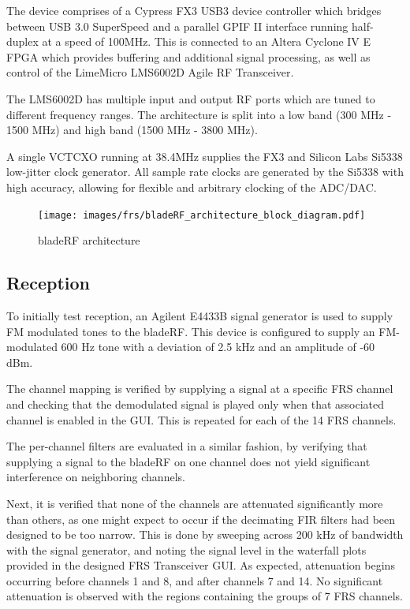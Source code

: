 The device comprises of a Cypress FX3 USB3 device controller which bridges between
USB 3.0 SuperSpeed and a parallel GPIF II interface running half-duplex at a speed
of 100MHz.  This is connected to an Altera Cyclone IV E \ac{FPGA} which provides
buffering and additional signal processing, as well as control of the 
LimeMicro LMS6002D Agile RF Transceiver.

The LMS6002D has multiple input and output RF ports which are tuned to different
frequency ranges.  The architecture is split into a low band (300 MHz - 1500 MHz)
and high band (1500 MHz - 3800 MHz).

A single VCTCXO running at 38.4MHz supplies the FX3 and Silicon Labs Si5338
low-jitter clock generator.  All sample rate clocks are generated by the Si5338 with high
accuracy, allowing for flexible and arbitrary clocking of the ADC/DAC.

\begin{figure}[h]
  \centering
  \texttt{[image: images/frs/bladeRF\_architecture\_block\_diagram.pdf]}
  \caption{bladeRF architecture}
  \label{fig:bladerf_architecture}
\end{figure}

\subsection{Reception}
To initially test reception, an Agilent E4433B signal generator \cite{SIGGEN}
is used to supply FM modulated tones to the bladeRF. This device is configured
to supply an FM-modulated 600 Hz tone with a deviation of 2.5 kHz and an
amplitude of -60 dBm.

The channel mapping is verified by supplying a signal at a specific \ac{FRS}
channel and checking that the demodulated signal is played only when that
associated channel is enabled in the \ac{GUI}. This is repeated for each of the 14
\ac{FRS} channels.

The per-channel filters are evaluated in a similar fashion, by verifying that
supplying a signal to the bladeRF on one channel does not yield significant
interference on neighboring channels.

Next, it is verified that none of the channels are attenuated significantly
more than others, as one might expect to occur if the decimating \ac{FIR}
filters had been designed to be too narrow. This is done by sweeping across
200 kHz of bandwidth with the signal generator, and noting the signal level
in the waterfall plots provided in the designed \ac{FRS} Transceiver \ac{GUI}. As
expected, attenuation begins occurring before channels 1 and 8, and after
channels 7 and 14. No significant attenuation is observed with the regions
containing the groups of 7 \ac{FRS} channels.

